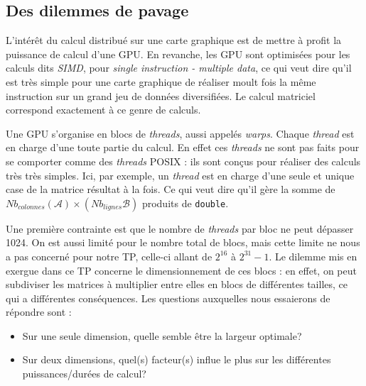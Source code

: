 \documentclass[	DIV=calc,%
							paper=a4,%
							fontsize=11pt%
							]{scrartcl}	 					%
\begin{document}
\subsection{Des dilemmes de pavage}
L'intérêt du calcul distribué sur une carte graphique est de mettre à profit la puissance de calcul d'une GPU. En revanche, les GPU sont optimisées pour les calculs dits \textit{SIMD}, pour \textit{single instruction - multiple data}, ce qui veut dire qu'il est très simple pour une carte graphique de réaliser moult fois la même instruction sur un grand jeu de données diversifiées. Le calcul matriciel correspond exactement à ce genre de calculs.\par
Une GPU s'organise en blocs de \textit{threads}, aussi appelés \textit{warps}. Chaque \textit{thread} est en charge d'une toute partie du calcul. En effet ces \textit{threads} ne sont pas faits pour se comporter comme des \textit{threads} POSIX : ils sont conçus pour réaliser des calculs très très simples. Ici, par exemple, un \textit{thread} est en charge d'une seule et unique case de la matrice résultat à la fois. Ce qui veut dire qu'il gère la somme de $Nb_{colonnes}(\mathcal{A}) \times (Nb_{lignes}\mathcal{B})$ produits de \texttt{double}.\par
Une première contrainte est que le nombre de \textit{threads} par bloc ne peut dépasser 1024. On est aussi limité pour le nombre total de blocs, mais cette limite ne nous a pas concerné pour notre TP, celle-ci allant de $2^{16}$ à $2^{31} - 1$. Le dilemme mis en exergue dans ce TP concerne le dimensionnement de ces blocs : en effet, on peut subdiviser les matrices à multiplier entre elles en blocs de différentes tailles, ce qui a différentes conséquences. Les questions auxquelles nous essaierons de répondre sont : 
\begin{itemize}
\item Sur une seule dimension, quelle semble être la largeur optimale?
\item Sur deux dimensions, quel(s) facteur(s) influe le plus sur les différentes puissances/durées de calcul?
\end{itemize}
\end{document}
